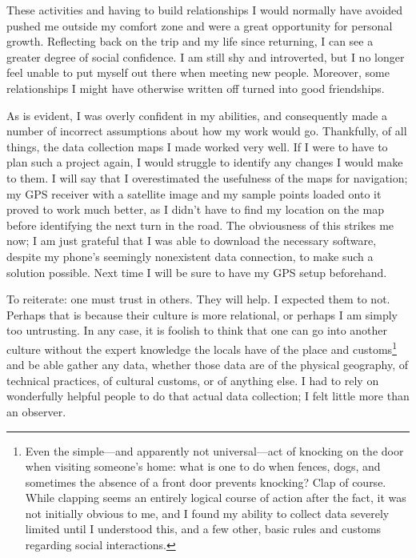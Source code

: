 These activities and having to build relationships I would normally have avoided pushed me outside my comfort zone and were a great opportunity for personal growth. Reflecting back on the trip and my life since returning, I can see a greater degree of social confidence. I am still shy and introverted, but I no longer feel unable to put myself out there when meeting new people. Moreover, some relationships I might have otherwise written off turned into good friendships.

As is evident, I was overly confident in my abilities, and consequently made a number of incorrect assumptions about how my work would go. Thankfully, of all things, the data collection maps I made worked very well. If I were to have to plan such a project again, I would struggle to identify any changes I would make to them. I will say that I overestimated the usefulness of the maps for navigation; my GPS receiver with a satellite image and my sample points loaded onto it proved to work much better, as I didn't have to find my location on the map before identifying the next turn in the road. The obviousness of this strikes me now; I am just grateful that I was able to download the necessary software, despite my phone’s seemingly nonexistent data connection, to make such a solution possible. Next time I will be sure to have my GPS setup beforehand.

To reiterate: one must trust in others. They will help. I expected them to not. Perhaps that is because their culture is more relational, or perhaps I am simply too untrusting. In any case, it is foolish to think that one can go into another culture without the expert knowledge the locals have of the place and customs\footnote{Even the simple---and apparently not universal---act of knocking on the door when visiting someone's home: what is one to do when fences, dogs, and sometimes the absence of a front door prevents knocking? Clap of course. While clapping seems an entirely logical course of action after the fact, it was not initially obvious to me, and I found my ability to collect data severely limited until I understood this, and a few other, basic rules and customs regarding social interactions.} and be able gather any data, whether those data are of the physical geography, of technical practices, of cultural customs, or of anything else. I had to rely on wonderfully helpful people to do that actual data collection; I felt little more than an observer. 